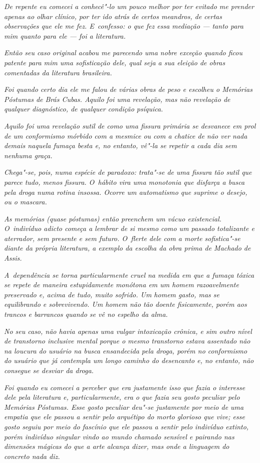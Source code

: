 \emph{De repente eu comecei a conhecê"-lo um pouco melhor por ter evitado
me prender apenas ao olhar clínico, por ter ido atrás de certos
meandros, de certas observações que ele me fez. E~confesso: o que fez
essa mediação --- tanto para mim quanto para ele --- foi a literatura.}~

\emph{Então seu caso original acabou me parecendo uma nobre exceção
quando ficou patente para mim uma sofisticação dele, qual seja a sua
eleição de obras comentadas da literatura brasileira.}~

\emph{Foi quando certo dia ele me falou de várias obras de peso e
escolheu o \emph{Memórias Póstumas de Brás Cubas}. Aquilo foi uma revelação,
mas não revelação de qualquer diagnóstico, de qualquer condição
psíquica.}~

\emph{Aquilo foi uma revelação sutil de como uma fissura primária se
desvanece em prol de um conformismo mórbido com a mesmice ou com a
chatice de não ver nada demais naquela fumaça besta e, no entanto, vê"-la
se repetir a cada dia sem nenhuma graça.}~

\emph{Chega"-se, pois, numa espécie de paradoxo: trata"-se de uma fissura
tão sutil que parece tudo, menos fissura. O~hábito vira uma monotonia que
disfarça a busca pela droga numa rotina insossa. Ocorre um automatismo
que suprime o desejo, ou o mascara.}~

\emph{As memórias (quase póstumas) então preenchem um vácuo existencial.
O~indivíduo adicto começa a lembrar de si mesmo como um passado
totalizante e aterrador, sem presente e sem futuro. O~flerte dele com a
morte sofistica"-se diante da própria literatura, a exemplo da escolha da
obra prima de Machado de Assis.}~

\emph{A~dependência se torna particularmente cruel na medida em que a
fumaça tóxica se repete de maneira estupidamente monótona em um homem
razoavelmente preservado e, acima de tudo, muito sofrido. Um homem
gasto, mas se equilibrando e sobrevivendo. Um homem não tão doente
fisicamente, porém aos trancos e barrancos quando se vê no espelho da
alma.}~

\emph{No seu caso, não havia apenas uma vulgar intoxicação crônica, e
sim outro nível de transtorno inclusive mental porque o mesmo transtorno
estava assentado não na loucura do usuário na busca ensandecida pela
droga, porém no conformismo do usuário que já contempla um longo caminho
do desencanto e, no entanto, não consegue se desviar da droga.}~

\emph{Foi quando eu comecei a perceber que era justamente isso que fazia
o interesse dele pela literatura e, particularmente, era o que fazia seu
gosto peculiar pelo \emph{Memórias Póstumas}. Esse gosto peculiar deu"-se
justamente por meio de uma empatia que ele passou a sentir pelo
arquétipo do morto glorioso que vive; esse gosto seguiu por meio do
fascínio que ele passou a sentir pelo indivíduo extinto, porém indivíduo
singular vindo ao mundo chamado sensível e pairando nas dimensões
mágicas do que a arte alcança dizer, mas onde a linguagem do concreto
nada diz.}~

